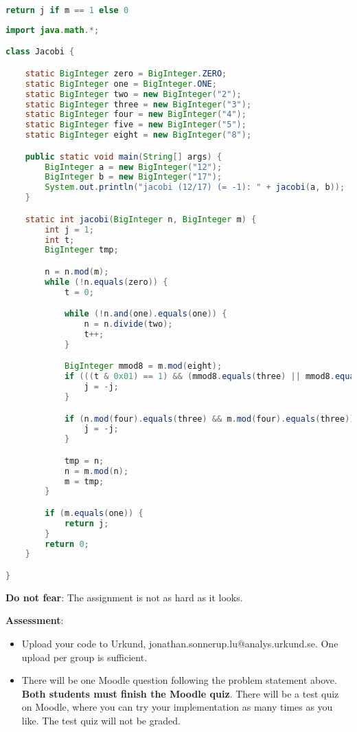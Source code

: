 \documentclass{article}
\begin{document}
\begin{description}
{\begin{lstlisting}[float=htb, style=customc, language=python, caption={The Jacobi symbol in Python.}, label={lst:jacobi}]
	return j if m == 1 else 0
\end{lstlisting}
				
				
\begin{lstlisting}[float=h, style=customc, language=java, caption={The Jacobi symbol in Java.}, label={lst:jacobi_java}]
import java.math.*;

class Jacobi {

	static BigInteger zero = BigInteger.ZERO;
	static BigInteger one = BigInteger.ONE;
	static BigInteger two = new BigInteger("2");
	static BigInteger three = new BigInteger("3");
	static BigInteger four = new BigInteger("4");
	static BigInteger five = new BigInteger("5");
	static BigInteger eight = new BigInteger("8");

	public static void main(String[] args) {
		BigInteger a = new BigInteger("12");
		BigInteger b = new BigInteger("17");
		System.out.println("jacobi (12/17) (= -1): " + jacobi(a, b));
	}

	static int jacobi(BigInteger n, BigInteger m) {
		int j = 1;
		int t;
		BigInteger tmp;

		n = n.mod(m);
		while (!n.equals(zero)) {
			t = 0;

			while (!n.and(one).equals(one)) {
				n = n.divide(two);
				t++;
			}

			BigInteger mmod8 = m.mod(eight);
			if (((t & 0x01) == 1) && (mmod8.equals(three) || mmod8.equals(five))) {
				j = -j;
			}

			if (n.mod(four).equals(three) && m.mod(four).equals(three)) {
				j = -j;
			}

			tmp = n;
			n = m.mod(n);
			m = tmp;
		}

		if (m.equals(one)) {
			return j;
		}
		return 0;
	}

}
\end{lstlisting}
				
				\textbf{Do not fear}: The assignment is not as hard as it looks.
				
				\textbf{Assessment}:
				\begin{itemize}
					\item Upload your code to Urkund, jonathan.sonnerup.lu@analys.urkund.se.
					One upload per group is sufficient.
					
					\item There will be one Moodle question following the problem statement above. 
					\textbf{Both students must finish the Moodle quiz}.
					There will be a test quiz on Moodle, where you can try your implementation as many times as you like. 
					The test quiz will not be graded.
				\end{itemize}
			}
			
		\end{description}
		
	
\end{document}
